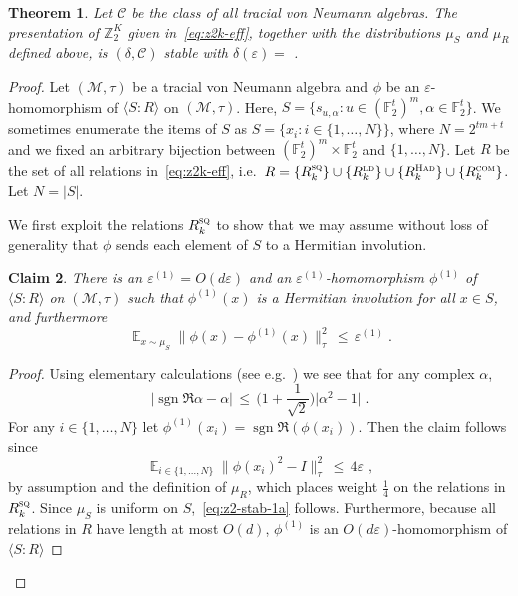 \documentclass[11pt]{article}
\newtheorem{theorem}{Theorem}[section]
\newtheorem{claim}[theorem]{Claim}
\theoremstyle{definition}
\newcommand{\Id}{\ensuremath{I}}
\DeclareMathOperator*{\Expectation}{\mathbb{E}}
\newcommand{\Es}[1]{\Expectation_{#1}}
\newcommand{\F}{\ensuremath{\mathbb{F}}}
\newcommand{\ld}{\textsc{ld}}
\newcommand{\com}{\textsc{com}}
\newcommand{\sq}{\textsc{sq}}
\newcommand{\Z}{\ensuremath{\mathbb{Z}}}
\newcommand{\mC}{\ensuremath{\mathcal{C}}}
\newcommand{\mM}{\ensuremath{\mathcal{M}}}
\newcommand{\had}{\textsc{Had}}
\newcommand{\eps}{\varepsilon}
\DeclareMathOperator{\sgn}{sgn}
\begin{document}
\begin{theorem}\label{thm:z2-stab}
Let $\mC$ be the class of all tracial von Neumann algebras. 
The presentation of  $\Z_2^K$ given in~\eqref{eq:z2k-eff}, together with the distributions $\mu_S$ and $\mu_R$ defined above, is $(\delta,\mC)$ stable with $\delta(\eps)=$ . 
\end{theorem}


\begin{proof}
Let $(\mM,\tau)$ be a tracial von Neumann algebra and $\phi$ be an $\eps$-homomorphism of $\langle S:R\rangle$ on $(\mM,\tau)$. 
 Here, $S = \{s_{u,\alpha}: u\in (\F_2^t)^m, \alpha\in \F_2^t\}$. We sometimes enumerate the items of $S$ as $S=\{x_i: i\in\{1,\ldots,N\}\}$, where $N=2^{tm+t}$ and we fixed an arbitrary bijection between $(\F_2^t)^m\times \F_2^t$ and $\{1,\ldots,N\}$. Let $R$ be the set of all relations in~\eqref{eq:z2k-eff}, i.e.\ $R= \{R_k^\sq\}\cup \{R^\ld_k\}\cup\{R^\had_k\}\cup\{R^\com_k\}$. Let $N=|S|$.

We first exploit the relations $R_k^\sq$ to show that we may assume without loss of generality that $\phi$ sends each element of $S$ to a Hermitian involution. 

\begin{claim}\label{claim:z2-stab-1}
There is an $\eps^{(1)}=O(d\eps)$ and an $\eps^{(1)}$-homomorphism $\phi^{(1)}$ of $\langle S:R\rangle$ on $(\mM,\tau)$ such that $\phi^{(1)}(x)$ is a Hermitian involution for all $x\in S$, and furthermore
\begin{equation}\label{eq:z2-stab-1a}
 \Es{x\sim\mu_S} \big\| \phi(x) - \phi^{(1)}(x) \big\|_\tau^2 \,\leq\, \eps^{(1)}\;.
\end{equation}
\end{claim}

\begin{proof}
Using elementary calculations (see e.g.~\cite[Lemma 3.6]{slofstra2019set}) we see that for any complex $\alpha$, 
\[ \big| \sgn\Re\alpha-\alpha\big| \,\leq\, \Big(1+\frac{1}{\sqrt{2}}\Big) \big|\alpha^2 -1 \big|\;.\]
For any $i\in \{1,\ldots,N\}$ let $\phi^{(1)}(x_i) = \sgn\Re (\phi(x_i))$. Then the claim follows since 
\[ \Es{i\in\{1,\ldots,N\}} \big\| \phi(x_i)^2-\Id \big\|_\tau^2 \,\leq\, 4\eps\;,\]
by assumption and the definition of $\mu_R$, which places weight $\frac{1}{4}$ on the relations in $R_k^\sq$. Since $\mu_S$ is uniform on $S$,~\eqref{eq:z2-stab-1a} follows. Furthermore, because all relations in $R$ have length at most $O(d)$, $\phi^{(1)}$ is an $O(d\eps)$-homomorphism of $\langle S:R\rangle$ 
\end{proof}


\end{proof}
\end{document}
